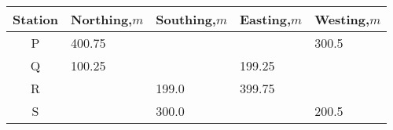 \begin{tabular}{|c|p{1.5cm}|p{1.5cm}|p{1.5cm}|p{1.5cm}|}
    \hline
    Station & Northing,$m$ & Southing,$m$ & Easting,$m$ & Westing,$m$\\
    \hline
    P & 400.75 &  &  & 300.5 \\
    \hline
    Q & 100.25 &  & 199.25 &  \\
    \hline
    R &  & 199.0 & 399.75 &  \\
    \hline
    S &  & 300.0 &  & 200.5 \\
    \hline
\end{tabular}